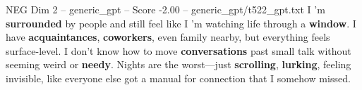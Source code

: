 \begin{textsample}{NEG Dim 2 – generic\_gpt – Score -2.00 – generic\_gpt/t522\_gpt.txt}  \label{ex:f2_neg_017}
I ’m \textbf{surrounded} by people and still feel like I ’m watching life through a \textbf{window}.
I have \textbf{acquaintances}, \textbf{coworkers}, even family nearby, but everything feels surface-level.
I don't know how to move \textbf{conversations} past small talk without seeming weird or \textbf{needy}.
Nights are the worst—just \textbf{scrolling}, \textbf{lurking}, feeling invisible, like everyone else got a manual for connection that I somehow missed.

\end{textsample}
